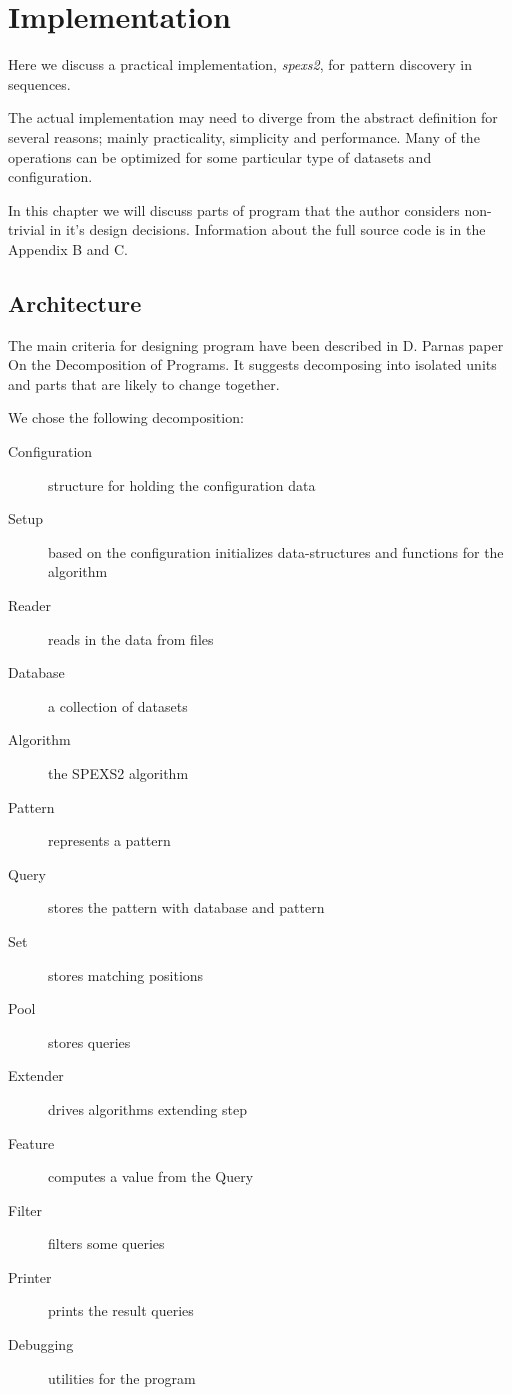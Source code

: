 \chapter{Implementation}

Here we discuss a practical implementation, \emph{spexs2}, for
pattern discovery in sequences.

The actual implementation may need to diverge from the abstract
definition for several reasons; mainly practicality, simplicity and
performance. Many of the operations can be optimized for some 
particular type of datasets and configuration.

In this chapter we will discuss parts of program that the author
considers non-trivial in it's design decisions. Information about 
the full source code is in the Appendix B and C.

\section{Architecture}

The main criteria for designing program have been described in D. Parnas
paper On the Decomposition of Programs. It suggests decomposing into
isolated units and parts that are likely to change together. \cite{Parnas72}

We chose the following decomposition:

\begin{description}
	\item[Configuration] structure for holding the configuration data
	\item[Setup] based on the configuration initializes data-structures and functions for the algorithm
	\item[Reader] reads in the data from files
	\item[Database] a collection of datasets
	\item[Algorithm] the SPEXS2 algorithm
		\item[Pattern] represents a pattern
		\item[Query] stores the pattern with database and pattern
		\item[Set] stores matching positions
		\item[Pool] stores queries
		\item[Extender] drives algorithms extending step
		\item[Feature] computes a value from the Query
		\item[Filter] filters some queries
	\item[Printer] prints the result queries
	\item[Debugging] utilities for the program
\end{description}

